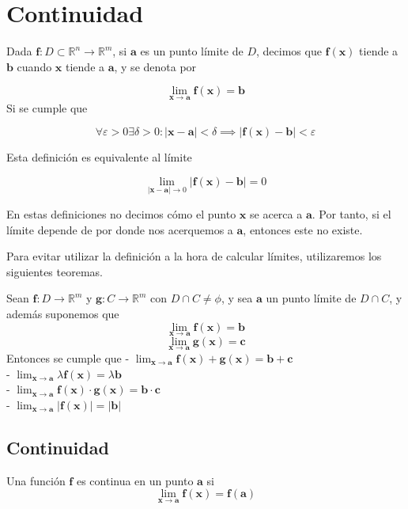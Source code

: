 \documentclass{./Calculo.tex}
\begin{document}
\chapter{Continuidad}
\begin{defin}
Dada $\mathbf{f}:D\subset \mathbb{R}^{n}\to \mathbb{R}^{m}$, si $\mathbf{a}$ es un punto límite de $D$, decimos que $\mathbf{f}(\mathbf{x})$ tiende a $\mathbf{b}$ cuando $\mathbf{x}$ tiende a $\mathbf{a}$, y se denota por
 
$$
\lim_{ \mathbf{x} \to \mathbf{a} } \mathbf{f}(\mathbf{x})=\mathbf{b}
$$
Si se cumple que
 
$$
\forall \varepsilon > 0 \exists\delta>0 : |\mathbf{x}-\mathbf{a}|<\delta \implies |\mathbf{f}(\mathbf{x}) - \mathbf{b}|<\varepsilon
$$

Esta definición es equivalente al límite
 
$$
\lim_{ |\mathbf{x}-\mathbf{a}| \to 0 } |\mathbf{f}(\mathbf{x})-\mathbf{b}| = 0 
$$

En estas definiciones no decimos cómo el punto $\mathbf{x}$ se acerca a $\mathbf{a}$. Por tanto, si el límite depende de por donde nos acerquemos a $\mathbf{a}$, entonces este no existe.
\end{defin}
Para evitar utilizar la definición a la hora de calcular límites, utilizaremos los siguientes teoremas.
\begin{teorema}
Sean $\mathbf{f}:D\to \mathbb{R}^{m}$ y $\mathbf{g}:C\to \mathbb{R}^{m}$ con $D\cap C \neq \phi$, y sea $\mathbf{a}$ un punto límite de $D\cap C$, y además suponemos que
$$
\lim_{ \mathbf{x} \to \mathbf{a} } \mathbf{f}(\mathbf{x})=\mathbf{b}
$$
$$
\lim_{ \mathbf{x} \to \mathbf{a} } \mathbf{g}(\mathbf{x})=\mathbf{c}
$$
Entonces se cumple que
- $\lim_{ \mathbf{x} \to \mathbf{a} } \mathbf{f}(\mathbf{x})+\mathbf{g}(\mathbf{x})=\mathbf{b}+\mathbf{c}$\\
- $\lim_{ \mathbf{x} \to \mathbf{a} } \lambda\mathbf{f}(\mathbf{x})=\lambda\mathbf{b}$\\
- $\lim_{ \mathbf{x} \to \mathbf{a} } \mathbf{f}(\mathbf{x})\cdot\mathbf{g}(\mathbf{x})=\mathbf{b}\cdot\mathbf{c}$\\
- $\lim_{ \mathbf{x} \to \mathbf{a} }|\mathbf{f}(\mathbf{x})|=|\mathbf{b}|$\\
\end{teorema}
\section{Continuidad}
\begin{defin}
Una función $\mathbf{f}$ es continua en un punto $\mathbf{a}$ si
$$
\lim_{ \mathbf{x} \to \mathbf{a} } \mathbf{f}(\mathbf{x})=\mathbf{f}(\mathbf{a})
$$
\end{defin}
\end{document}
